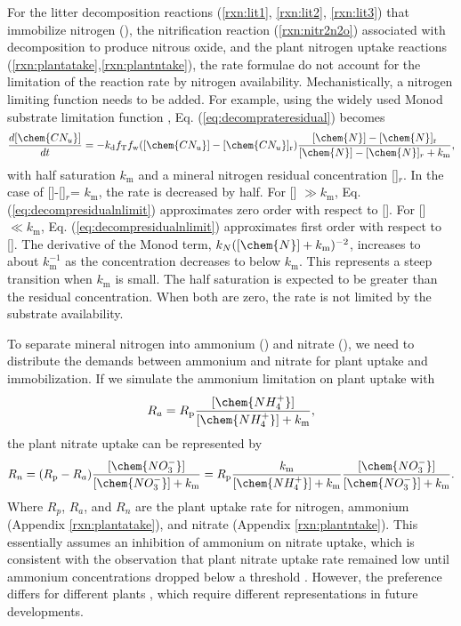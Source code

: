 \documentclass[gmd, manuscript]{copernicus}
\begin{document}
For the litter decomposition reactions (\ref{rxn:lit1}, \ref{rxn:lit2}, \ref{rxn:lit3}) that immobilize nitrogen (), the nitrification reaction (\ref{rxn:nitr2n2o}) associated with decomposition to produce nitrous oxide, and the plant nitrogen uptake reactions (\ref{rxn:plantatake},\ref{rxn:plantntake}), the rate formulae do not account for the limitation of the reaction rate by nitrogen
availability. Mechanistically, a nitrogen limiting function needs to be added. For example, using the widely used Monod substrate limitation function \citep{Hammond2003}, Eq.
(\ref{eq:decomprateresidual}) becomes 
\begin{equation}
\frac{d [\chem{CN_u}]}{d t} = -k_\text{d} f_\text{T} f_\text{w} ([\chem{CN_u}] -
[\chem{CN_u}]_\text{r}) \frac{[\chem{N}]-[\chem{N}]_\text{r}}{[\chem{N}]-[\chem{N}]_r +k_\text{m}},
\label{eq:decompresidualnlimit}
\end{equation}
with half saturation $k_\text{m}$ and a mineral nitrogen residual concentration []$_r$. In the case of []-[]$_r$= $k_\text{m}$, the rate is decreased by half.
For [] $\gg k_\text{m}$, Eq. (\ref{eq:decompresidualnlimit}) approximates zero order with respect to []. For []$\ll k_\text{m}$, Eq. (\ref{eq:decompresidualnlimit})
approximates first order with respect to []. The derivative of the Monod term, ${k_N}{([\chem{N}]+k_\text{m})^{-2}}$, increases to about $k_\text{m}^{-1}$ as the concentration
decreases to below $k_\text{m}$. This represents a steep transition when $k_\text{m}$ is small. The half saturation is expected to be greater than the residual concentration. When both are zero, the rate is not limited by the substrate availability. 

To separate mineral nitrogen into ammonium () and nitrate (), we need to distribute the demands between ammonium and nitrate for plant uptake and immobilization. If we simulate the ammonium limitation on plant uptake with 
\begin{equation}
R_a = R_\text{p} \frac{[\chem{NH_4^+}]}{[\chem{NH_4^+}]+k_\text{m}}, 
\label{eq:plantarate}
\end{equation}
the plant nitrate uptake can be represented by 
\begin{equation}
R_n = (R_\text{p} - R_a)\frac{[\chem{NO_3^-}]}{[\chem{NO_3^-}]+k_\text{m}} =
R_\text{p} \frac{k_\text{m}}{[\chem{NH_4^+}]+k_\text{m}}
\frac{[\chem{NO_3^-}]}{[\chem{NO_3^-}]+k_\text{m}}.  
\label{eq:plantnrate}
\end{equation}
Where $R_p$, $R_a$, and $R_n$ are the plant uptake rate for nitrogen, ammonium (Appendix \ref{rxn:plantatake}), and nitrate (Appendix \ref{rxn:plantntake}). This essentially assumes an inhibition of ammonium on nitrate uptake, which is consistent with
the observation that plant nitrate uptake rate remained low until ammonium concentrations dropped below a threshold \citep{eltrop1996}.  However, the preference differs for different plants \citep{Pfautsch2009,Warren2007,Nordin2001,Falkengren1995,Gherardi2013}, which require different representations in future developments.
\end{document}
